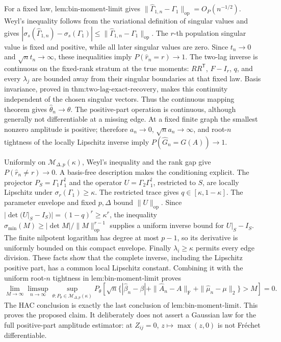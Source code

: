 For a fixed law, \(\text{lem:bin-moment-limit}\) gives \(\|\widehat\Gamma_{1,n}-\Gamma_1\|_{\mathrm{op}}=O_P(n^{-1/2})\).  Weyl's inequality follows from the variational definition of singular values and gives \(|\sigma_s(\widehat\Gamma_{1,n})-\sigma_s(\Gamma_1)|\leq\|\widehat\Gamma_{1,n}-\Gamma_1\|_{\mathrm{op}}\).  The \(r\)-th population singular value is fixed and positive, while all later singular values are zero.  Since \(t_n\to0\) and \(\sqrt n t_n\to\infty\), these inequalities imply \(P(\widehat r_n=r)\to1\).  The two-lag inverse is continuous on the fixed-rank stratum at the true moments: \(RR^{\mathsf T}\), \(F-I_r\), \(q\), and every \(\lambda_j\) are bounded away from their singular boundaries at that fixed law.  Basis invariance, proved in \(\text{thm:two-lag-exact-recovery}\), makes this continuity independent of the chosen singular vectors.  Thus the continuous mapping theorem gives \(\widehat\theta_n\to\theta\).  The positive-part operation is continuous, although generally not differentiable at a missing edge.  At a fixed finite graph the smallest nonzero amplitude is positive; therefore \(a_n\to0\), \(\sqrt n a_n\to\infty\), and root-\(n\) tightness of the locally Lipschitz inverse imply \(P(\widehat G_n=G(A))\to1\).

Uniformly on \(\mathcal M_{\Delta,p}(\kappa)\), Weyl's inequality and the rank gap give \(P(\widehat r_n\neq r)\to0\).  A basis-free description makes the conditioning explicit.  The projector \(P_S=\Gamma_1\Gamma_1^\dagger\) and the operator \(U=\Gamma_2\Gamma_1^\dagger\), restricted to \(S\), are locally Lipschitz under \(\sigma_r(\Gamma_1)\geq\kappa\).  The restricted trace gives \(q\in[\kappa,1-\kappa]\).  The parameter envelope and fixed \(p,\Delta\) bound \(\|U\|_{\mathrm{op}}\).  Since \(|\det(U|_S-I_S)|=(1-q)^r\geq\kappa^r\), the inequality \(\sigma_{\min}(M)\geq|\det M|/\|M\|_{\mathrm{op}}^{r-1}\) supplies a uniform inverse bound for \(U|_S-I_S\).  The finite nilpotent logarithm has degree at most \(p-1\), so its derivative is uniformly bounded on this compact envelope.  Finally \(\lambda_i\geq\kappa\) permits every edge division.  These facts show that the complete inverse, including the Lipschitz positive part, has a common local Lipschitz constant.  Combining it with the uniform root-\(n\) tightness in \(\text{lem:bin-moment-limit}\) proves
\[
 \lim_{M\to\infty}\limsup_{n\to\infty}\sup_{\theta:P_\theta\in\mathcal M_{\Delta,p}(\kappa)}
 P_\theta\!\left[\sqrt n\{|\widehat\beta_n-\beta|+\|\widehat A_n-A\|_{\mathrm F}+\|\widehat\mu_n-\mu\|_2\}>M\right]=0.
\]
The HAC conclusion is exactly the last conclusion of \(\text{lem:bin-moment-limit}\).  This proves the proposed claim.  It deliberately does not assert a Gaussian law for the full positive-part amplitude estimator: at \(Z_{ij}=0\), \(z\mapsto\max(z,0)\) is not Fr\'{e}chet differentiable.